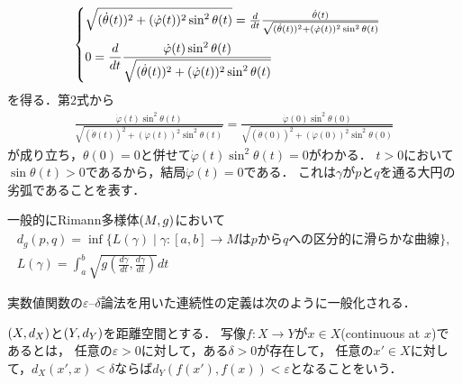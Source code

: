 \documentclass{ltjsbook}
\begin{document}
\begin{specialexample}
\begin{align*}
\begin{cases}
{            \sqrt{(\dot{\theta}(t))^2 + (\dot{\varphi}(t))^2 \sin^2 \theta(t)}
        }
        =
        \frac{d}{dt}
        \frac{%
            \dot{\theta}(t)
        }{%
            \sqrt{(\dot{\theta}(t))^2 + (\dot{\varphi}(t))^2 \sin^2 \theta(t)}
        } \\[10pt]
        \displaystyle
        0 =
        \frac{d}{dt}
        \frac{%
            \dot{\varphi}(t) \sin^2\theta(t)
        }{%
            \sqrt{(\dot{\theta}(t))^2 + (\dot{\varphi}(t))^2 \sin^2 \theta(t)}
        }
    \end{cases}
\end{align*}
を得る．第\(2\)式から
\begin{align*}
        \frac{\dot{\varphi}(t) \sin^2\theta(t)}{\sqrt{(\dot{\theta}(t))^2 + (\dot{\varphi}(t))^2 \sin^2 \theta(t)}}
        =
        \frac{\dot{\varphi}(0) \sin^2\theta(0)}{\sqrt{(\dot{\theta}(0))^2 + (\dot{\varphi}(0))^2 \sin^2 \theta(0)}}
\end{align*}
が成り立ち，\(\theta(0) = 0\)と併せて\(\dot{\varphi}(t) \sin^2\theta(t) = 0\)がわかる．
\(t > 0\)において\(\sin \theta(t) > 0\)であるから，結局\(\dot{\varphi}(t) = 0\)である．
これは\(\gamma\)が\(p\)と\(q\)を通る大円の劣弧であることを表す．

一般的にRimann多様体\((M, g)\)において
\begin{gather*}
    d_g(p, q) = \inf \{ L(\gamma) \mid \text{\(\gamma \colon [a, b] \to M\)は\(p\)から\(q\)への区分的に滑らかな曲線}\}, \\
    L(\gamma) = \int_{a}^{b} \sqrt{g\left(\frac{d\gamma}{dt}, \frac{d\gamma}{dt}\right)} dt
\end{gather*}
\end{specialexample}

実数値関数の\(\varepsilon\)--\(\delta\)論法を用いた連続性の定義は次のように一般化される．

\begin{thmbox}
\begin{definition}
\((X, d_{X})\)と\((Y, d_{Y})\)を距離空間とする．
写像\(f\colon X \to Y\)が\(x \in X\)(continuous at \(x\))であるとは，
任意の\(\varepsilon > 0\)に対して，ある\(\delta > 0\)が存在して，
任意の\(x' \in X\)に対して，\(d_{X}(x', x) < \delta\)ならば\(d_{Y}(f(x'), f(x)) < \varepsilon\)となることをいう．
\end{definition}
\end{thmbox}
\end{document}
